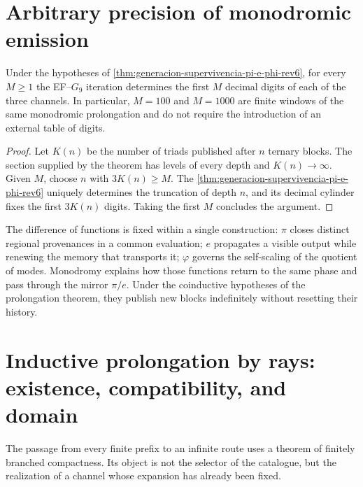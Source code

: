 \section{Arbitrary precision of monodromic emission}
\label{sec:precision-arbitraria-monodromia-rev6}

\begin{corollary}
\label{cor:precision-arbitraria-monodromia-rev6}
Under the hypotheses of
\cref{thm:generacion-supervivencia-pi-e-phi-rev6}, for every \(M\geq1\) the
EF--\(G_9\) iteration determines the first
\(M\) decimal digits of each of the three channels. In particular, \(M=100\)
and \(M=1000\) are finite windows of the same monodromic prolongation and do not
require the introduction of an external table of digits.
\end{corollary}

\begin{proof}
Let \(K(n)\) be the number of triads published after \(n\) ternary
blocks. The section supplied by the theorem has levels of every
depth and \(K(n)\to\infty\). Given \(M\),
choose \(n\) with \(3K(n)\geq M\). The
\cref{thm:generacion-supervivencia-pi-e-phi-rev6} uniquely determines
the truncation of depth \(n\), and its decimal cylinder fixes the
first \(3K(n)\) digits. Taking the first \(M\) concludes the argument.
\end{proof}

The difference of functions is fixed within a single construction: \(\pi\) closes distinct regional provenances in a common evaluation; \(e\) propagates a visible output while renewing the memory that transports it; \(\varphi\) governs the self-scaling of the quotient of modes. Monodromy explains how those functions return to the same phase and pass through the mirror \(\pi/e\). Under the coinductive hypotheses of the prolongation theorem, they publish new blocks indefinitely without resetting their history.

\ifdefined\HMTIncludeTargetFedRay
\section{Inductive prolongation by rays: existence, compatibility, and domain}
\label{sec:rayo-coinductivo-rev6}

The passage from every finite prefix to an infinite route uses a theorem of
finitely branched compactness. Its object is not the selector of the catalogue,
but the realization of a channel whose expansion has already been fixed.

